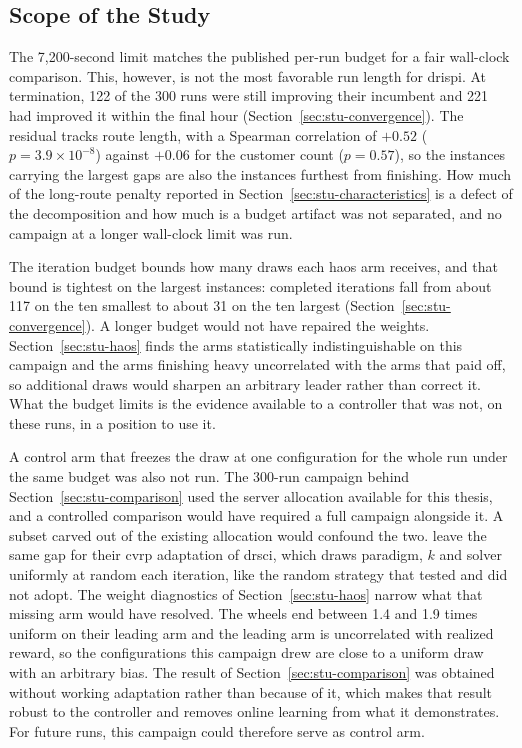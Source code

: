 \subsection{Scope of the Study}
\label{sec:con-scope}

The 7,200-second limit matches the published per-run budget for a fair wall-clock comparison. This, however, is not the most favorable run length for \gls{drispi}. At termination, 122 of the 300 runs were still improving their
incumbent and 221 had improved it within the final hour
(Section~\ref{sec:stu-convergence}). The residual tracks route length, with
a Spearman correlation of $+0.52$ ($p = 3.9 \times 10^{-8}$) against $+0.06$ for
the customer count ($p = 0.57$), so the instances carrying the largest gaps are
also the instances furthest from finishing. How much of the long-route penalty
reported in Section~\ref{sec:stu-characteristics} is a defect of the
decomposition and how much is a budget artifact was not separated, and no
campaign at a longer wall-clock limit was run.

The iteration budget bounds how many draws each \gls{haos} arm receives, and that
bound is tightest on the largest instances: completed iterations fall from about
117 on the ten smallest to about 31 on the ten largest
(Section~\ref{sec:stu-convergence}). A longer budget would not have
repaired the weights. Section~\ref{sec:stu-haos} finds the arms
statistically indistinguishable on this campaign and the arms finishing heavy
uncorrelated with the arms that paid off, so additional draws would sharpen an
arbitrary leader rather than correct it. What the budget limits is the evidence
available to a controller that was not, on these runs, in a position to use it.

A control arm that freezes the draw at one configuration for the whole run under
the same budget was also not run. The 300-run campaign behind
Section~\ref{sec:stu-comparison} used the server allocation available for
this thesis, and a controlled comparison would have required a full campaign alongside it. A
subset carved out of the existing allocation would confound the two.
\citet{altendeiteringDRSCICVRP2026} leave the same gap for their \gls{cvrp} adaptation of \gls{drsci}, which draws paradigm, $k$ and solver uniformly at random each iteration, like the random strategy that \citet{kerscherSolvingHeterogeneousVehicle} tested and did not adopt. The weight diagnostics of Section~\ref{sec:stu-haos} narrow what
that missing arm would have resolved. The wheels end between 1.4 and 1.9 times
uniform on their leading arm and the leading arm is uncorrelated with realized
reward, so the configurations this campaign drew are close to a uniform draw
with an arbitrary bias. The result of Section~\ref{sec:stu-comparison} was obtained without working adaptation
rather than because of it, which makes that result robust to the controller and
removes online learning from what it demonstrates. For future runs, this campaign could therefore serve as control arm.

